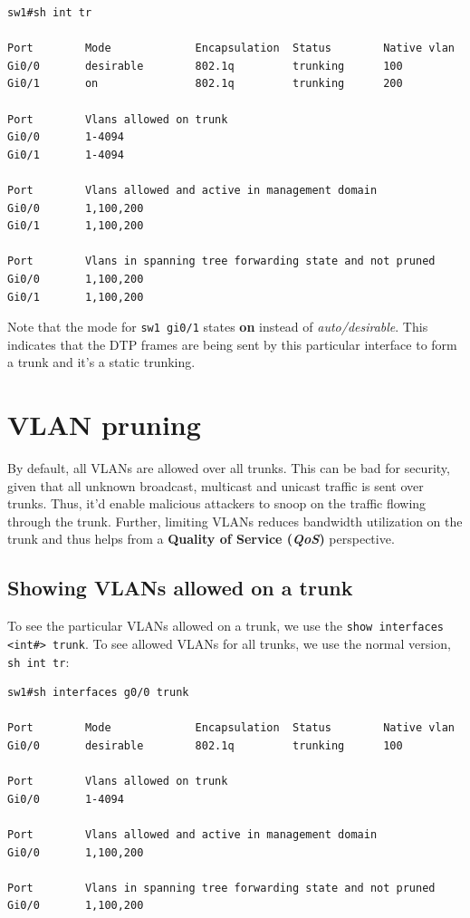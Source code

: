 \vspace{-15pt}
\begin{verbatim}
sw1#sh int tr

Port        Mode             Encapsulation  Status        Native vlan
Gi0/0       desirable        802.1q         trunking      100
Gi0/1       on               802.1q         trunking      200

Port        Vlans allowed on trunk
Gi0/0       1-4094
Gi0/1       1-4094

Port        Vlans allowed and active in management domain
Gi0/0       1,100,200
Gi0/1       1,100,200

Port        Vlans in spanning tree forwarding state and not pruned
Gi0/0       1,100,200
Gi0/1       1,100,200
\end{verbatim}
\vspace{-10pt}

\noindent
Note that the mode for \verb|sw1 gi0/1| states \textbf{on} instead of \textit{auto/desirable}. This indicates that the DTP frames are being sent by this particular interface to form a trunk and it's a static trunking. 

\section{VLAN pruning}
By default, all VLANs are allowed over all trunks. This can be bad for security, given that all unknown broadcast, multicast and unicast traffic is sent over trunks. Thus, it'd enable malicious attackers to snoop on the traffic flowing through the trunk. Further, limiting VLANs reduces bandwidth utilization on the trunk and thus helps from a \textbf{Quality of Service (\textit{QoS})} perspective. 

\subsection{Showing VLANs allowed on a trunk}
To see the particular VLANs allowed on a trunk, we use the \verb|show interfaces <int#> trunk|. To see allowed VLANs for all trunks, we use the normal version, \verb|sh int tr|:

\vspace{-15pt}
\begin{verbatim}
sw1#sh interfaces g0/0 trunk

Port        Mode             Encapsulation  Status        Native vlan
Gi0/0       desirable        802.1q         trunking      100

Port        Vlans allowed on trunk
Gi0/0       1-4094

Port        Vlans allowed and active in management domain
Gi0/0       1,100,200

Port        Vlans in spanning tree forwarding state and not pruned
Gi0/0       1,100,200
\end{verbatim}
\vspace{-10pt}

